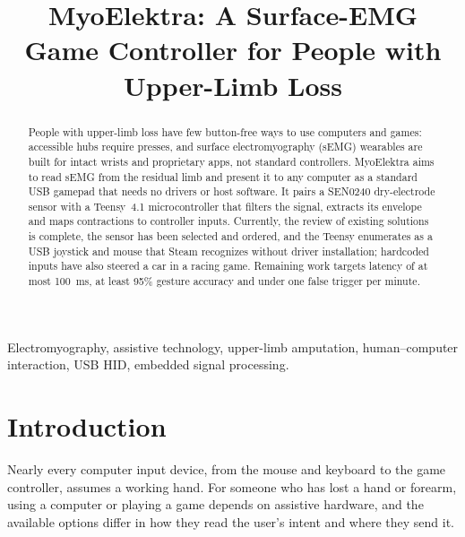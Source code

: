 \documentclass[conference]{IEEEtran}
\begin{document}
\title{\fontsize{20}{23}\selectfont MyoElektra: A Surface-EMG Game Controller for People with Upper-Limb Loss\vspace{-0.4\baselineskip}}

\author{
}

\IEEEaftertitletext{\vspace{-1.3\baselineskip}}
\maketitle

\begin{abstract}
People with upper-limb loss have few button-free ways to use computers and games: accessible hubs require presses, and surface electromyography (sEMG) wearables are built for intact wrists and proprietary apps, not standard controllers. MyoElektra aims to read sEMG from the residual limb and present it to any computer as a standard USB gamepad that needs no drivers or host software. It pairs a SEN0240 dry-electrode sensor with a Teensy~4.1 microcontroller that filters the signal, extracts its envelope and maps contractions to controller inputs. Currently, the review of existing solutions is complete, the sensor has been selected and ordered, and the Teensy enumerates as a USB joystick and mouse that Steam recognizes without driver installation; hardcoded inputs have also steered a car in a racing game. Remaining work targets latency of at most 100~ms, at least 95\% gesture accuracy and under one false trigger per minute.
\end{abstract}

\begin{IEEEkeywords}
Electromyography, assistive technology, upper-limb amputation, human--computer interaction, USB HID, embedded signal processing.
\end{IEEEkeywords}

\section{Introduction}

Nearly every computer input device, from the mouse and keyboard to the game controller, assumes a working hand. For someone who has lost a hand or forearm, using a computer or playing a game depends on assistive hardware, and the available options differ in how they read the user's intent and where they send it.
\end{document}
